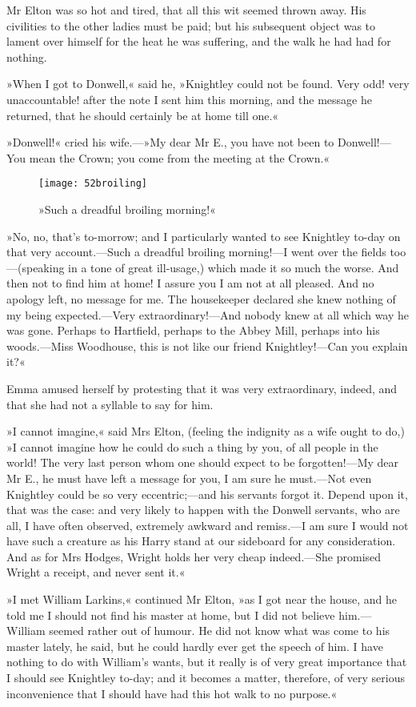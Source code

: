 Mr Elton was so hot and tired, that all this wit seemed thrown away. His civilities to the other ladies must be paid; but his subsequent object was to lament over himself for the heat he was suffering, and the walk he had had for nothing.

»When I got to Donwell,« said he, »Knightley could not be found. Very odd! very unaccountable! after the note I sent him this morning, and the message he returned, that he should certainly be at home till one.«

»Donwell!« cried his wife.—»My dear Mr E., you have not been to Donwell!—You mean the Crown; you come from the meeting at the Crown.«

\begin{figure}[tbph]
\centering
\texttt{[image: 52broiling]}
\caption{»Such a dreadful broiling morning!«}
\end{figure}

»No, no, that's to-morrow; and I particularly wanted to see Knightley to-day on that very account.—Such a dreadful broiling morning!—I went over the fields too—(speaking in a tone of great ill-usage,) which made it so much the worse. And then not to find him at home! I assure you I am not at all pleased. And no apology left, no message for me. The housekeeper declared she knew nothing of my being expected.—Very extraordinary!—And nobody knew at all which way he was gone. Perhaps to Hartfield, perhaps to the Abbey Mill, perhaps into his woods.—Miss Woodhouse, this is not like our friend Knightley!—Can you explain it?«

Emma amused herself by protesting that it was very extraordinary, indeed, and that she had not a syllable to say for him.

»I cannot imagine,« said Mrs Elton, (feeling the indignity as a wife ought to do,) »I cannot imagine how he could do such a thing by you, of all people in the world! The very last person whom one should expect to be forgotten!—My dear Mr E., he must have left a message for you, I am sure he must.—Not even Knightley could be so very eccentric;—and his servants forgot it. Depend upon it, that was the case: and very likely to happen with the Donwell servants, who are all, I have often observed, extremely awkward and remiss.—I am sure I would not have such a creature as his Harry stand at our sideboard for any consideration. And as for Mrs Hodges, Wright holds her very cheap indeed.—She promised Wright a receipt, and never sent it.«

»I met William Larkins,« continued Mr Elton, »as I got near the house, and he told me I should not find his master at home, but I did not believe him.—William seemed rather out of humour. He did not know what was come to his master lately, he said, but he could hardly ever get the speech of him. I have nothing to do with William's wants, but it really is of very great importance that I should see Knightley to-day; and it becomes a matter, therefore, of very serious inconvenience that I should have had this hot walk to no purpose.«

